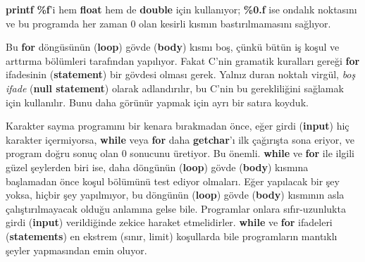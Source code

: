 \documentclass[a4paper,12pt,oneside]{book}
\begin{document}
\textbf{printf} \textbf{\%f}'i hem \textbf{float} hem de \textbf{double} için kullanıyor; \textbf{\%0.f} ise ondalık noktasını ve bu programda her zaman 0 olan kesirli kısmın bastırılmamasını sağlıyor.
\par Bu \textbf{for} döngüsünün (\textbf{loop}) gövde (\textbf{body}) kısmı boş, çünkü bütün iş koşul ve arttırma bölümleri tarafından yapılıyor. Fakat C'nin gramatik kuralları gereği \textbf{for} ifadesinin (\textbf{statement}) bir gövdesi olması gerek. Yalnız duran noktalı virgül, \textit{boş ifade} (\textbf{null statement}) olarak adlandırılır, bu C'nin bu gerekliliğini sağlamak için kullanılır. Bunu daha görünür yapmak için ayrı bir satıra koyduk.
\par Karakter sayma programını bir kenara bırakmadan önce, eğer girdi (\textbf{input}) hiç karakter içermiyorsa, \textbf{while} veya \textbf{for} daha \textbf{getchar}'ı ilk çağırışta sona eriyor, ve program doğru sonuç olan 0 sonucunu üretiyor. Bu önemli. \textbf{while} ve \textbf{for} ile ilgili güzel şeylerden biri ise, daha döngünün (\textbf{loop}) gövde (\textbf{body}) kısmına başlamadan önce koşul bölümünü test ediyor olmaları. Eğer yapılacak bir şey yoksa, hiçbir şey yapılmıyor, bu döngünün (\textbf{loop}) gövde (\textbf{body}) kısmının asla çalıştırılmayacak olduğu anlamına gelse bile. Programlar onlara sıfır-uzunlukta girdi (\textbf{input}) verildiğinde zekice haraket etmelidirler. \textbf{while} ve \textbf{for} ifadeleri (\textbf{statements}) en ekstrem (sınır, limit) koşullarda bile programların mantıklı şeyler yapmasından emin oluyor.
\end{document}
